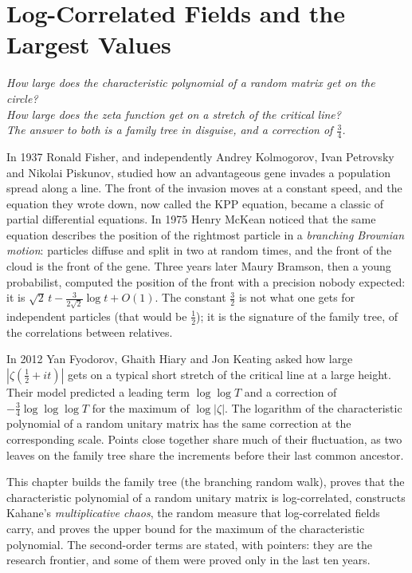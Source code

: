 \chapter{Log-Correlated Fields and the Largest Values}\label{ch:logcorr}

\begin{center}\itshape
How large does the characteristic polynomial of a random matrix get on the circle?\\
How large does the zeta function get on a stretch of the critical line?\\
The answer to both is a family tree in disguise, and a correction of $\frac34$.
\end{center}

In 1937 Ronald Fisher, and independently Andrey Kolmogorov, Ivan Petrovsky and Nikolai Piskunov, studied how an advantageous gene invades a population spread along a line. The front of the invasion moves at a constant speed,
and the equation they wrote down, now called the KPP equation, became a classic of partial differential equations. In 1975 Henry McKean noticed that the same equation describes the position of the rightmost particle in a
\emph{branching Brownian motion}: particles diffuse and split in two at random times, and the front of the cloud is the front of the gene. Three years later Maury Bramson, then a young probabilist, computed the position of
the front with a precision nobody expected: it is $\sqrt2\,t-\frac3{2\sqrt2}\log t+O(1)$. The constant $\frac32$ is not what one gets for independent particles (that would be $\frac12$); it is the signature of the family tree, of the
correlations between relatives.

In 2012 Yan Fyodorov, Ghaith Hiary and Jon Keating asked how large $|\zeta(\frac12+it)|$ gets on a typical short stretch of the critical line at a large height. Their model predicted a leading term $\log\log T$ and a correction of $-\frac34\log\log\log T$ for the maximum of $\log|\zeta|$. The logarithm of the characteristic polynomial of a random unitary matrix has the same correction at the corresponding scale. Points close together share much of their fluctuation, as two leaves on the family tree share the increments before their last common ancestor.

This chapter builds the family tree (the branching random walk), proves that the characteristic polynomial of a random unitary matrix is log-correlated, constructs Kahane's \emph{multiplicative chaos}, the random measure that
log-correlated fields carry, and proves the upper bound for the maximum of the characteristic polynomial. The second-order terms are stated, with pointers: they are the research frontier, and some of them were proved
only in the last ten years.

